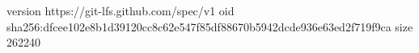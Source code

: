 version https://git-lfs.github.com/spec/v1
oid sha256:dfcee102e8b1d39120cc8c62e547f85df88670b5942dcde936e63ed2f719f9ca
size 262240
